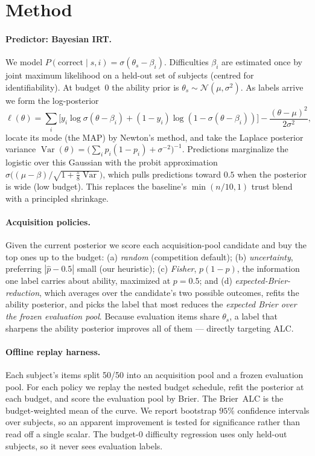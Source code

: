 \documentclass{article}
\begin{document}
\section{Method}

\paragraph{Predictor: Bayesian IRT.} We model $P(\text{correct}\mid s,i) =
\sigma(\theta_s-\beta_i)$. Difficulties $\beta_i$ are estimated once by joint
maximum likelihood on a held-out set of subjects (centred for identifiability).
At budget~0 the ability prior is $\theta_s\sim\mathcal N(\mu,\sigma^2)$. As
labels arrive we form the log-posterior
\[
  \ell(\theta)=\sum_i\big[y_i\log\sigma(\theta-\beta_i)+(1-y_i)\log(1-\sigma(\theta-\beta_i))\big]-\frac{(\theta-\mu)^2}{2\sigma^2},
\]
locate its mode (the MAP) by Newton's method, and take the Laplace posterior
variance $\operatorname{Var}(\theta)=\big(\sum_i p_i(1-p_i)+\sigma^{-2}\big)^{-1}$.
Predictions marginalize the logistic over this Gaussian with the probit
approximation $\sigma\!\big((\mu-\beta)/\sqrt{1+\tfrac{\pi}{8}\operatorname{Var}}\big)$,
which pulls predictions toward $0.5$ when the posterior is wide (low budget).
This replaces the baseline's $\min(n/10,1)$ trust blend with a principled
shrinkage.

\paragraph{Acquisition policies.} Given the current posterior we score each
acquisition-pool candidate and buy the top ones up to the budget:
(a) \emph{random} (competition default); (b) \emph{uncertainty}, preferring
$|\hat p-0.5|$ small (our heuristic); (c) \emph{Fisher}, $p(1-p)$, the
information one label carries about ability, maximized at $p=0.5$; and
(d) \emph{expected-Brier-reduction}, which averages over the candidate's two
possible outcomes, refits the ability posterior, and picks the label that most
reduces the \emph{expected Brier over the frozen evaluation pool}. Because
evaluation items share $\theta_s$, a label that sharpens the ability posterior
improves all of them --- directly targeting ALC.

\paragraph{Offline replay harness.} Each subject's items split 50/50 into an
acquisition pool and a frozen evaluation pool. For each policy we replay the
nested budget schedule, refit the posterior at each budget, and score the
evaluation pool by Brier. The Brier~ALC is the budget-weighted mean of the
curve. We report bootstrap $95\%$ confidence intervals over subjects, so an
apparent improvement is tested for significance rather than read off a single
scalar. The budget-0 difficulty regression uses only held-out subjects, so it
never sees evaluation labels.
\end{document}
